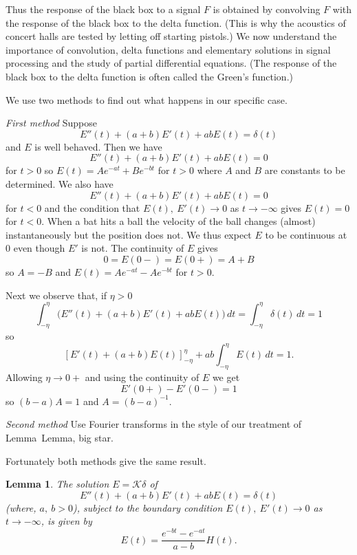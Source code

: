 \documentclass[12pt]{article}
\newtheorem{lemma}[theorem]{Lemma}
\theoremstyle{definition}
\begin{document}
Thus the response of the black box to a signal $F$
is obtained by convolving $F$ with the response of
the black box to the delta function. (This is why
the acoustics of concert halls are tested by letting off
starting pistols.) We now understand the importance
of convolution, delta functions and elementary solutions
in signal processing and the study of partial differential
equations. (The response of
the black box to the delta function is often called
the Green's function.)

We use two methods to find out what happens in our specific case.

\noindent\emph{First method} Suppose
\begin{equation*}
\tag*{$\bigstar$}
E''(t)+(a+b)E'(t)+ab E(t)=\delta(t)
\end{equation*}
and $E$ is well behaved. Then we have
\[E''(t)+(a+b)E'(t)+ab E(t)=0\]
for $t>0$ so $E(t)=Ae^{-at}+Be^{-bt}$ for $t>0$ where
$A$ and $B$ are constants to be determined. We also
have 
\[E''(t)+(a+b)E'(t)+ab E(t)=0\]
for $t<0$ and the condition that $E(t),\ E'(t)\rightarrow 0$
as $t\rightarrow-\infty$ gives $E(t)=0$ for $t<0$.
When a bat hits a ball the velocity of the ball changes
(almost) instantaneously but the position does not.
We thus expect $E$ to be continuous at $0$ even though
$E'$ is not. The continuity of $E$ gives
\[0=E(0-)=E(0+)=A+B\]
so $A=-B$ and $E(t)=Ae^{-at}-Ae^{-bt}$ for $t>0$.

Next we observe that, if $\eta>0$
\[\int_{-\eta}^{\eta}\big(E''(t)+(a+b)E'(t)+ab E(t)\big)\,dt=
\int_{-\eta}^{\eta}\delta(t)\,dt=1\]
so
\[\left[E'(t)+(a+b)E(t)\right]_{-\eta}^{\eta}
+ab\int_{-\eta}^{\eta}E(t)\,dt=1.\]
Allowing $\eta\rightarrow 0+$ and using the continuity
of $E$ we get
\[E'(0+)-E'(0-)=1\]
so $(b-a)A=1$ and $A=(b-a)^{-1}$.

\noindent\emph{Second method} Use Fourier transforms
in the style of our treatment of Lemma~{Lemma, big star}.

Fortunately both methods give the same result.
\begin{lemma}\label{Lemma, Big elementary}
The solution $E={\mathcal K}\delta$ of
\begin{equation*}
\tag*{$\bigstar$}
E''(t)+(a+b)E'(t)+ab E(t)=\delta(t)
\end{equation*}
(where, $a,\ b>0$), subject to the boundary condition
$E(t),\ E'(t)\rightarrow 0$ as $t\rightarrow -\infty$,
is given by
\[E(t)=\frac{e^{-bt}-e^{-at}}{a-b}H(t).\]
\end{lemma}
\end{document}
